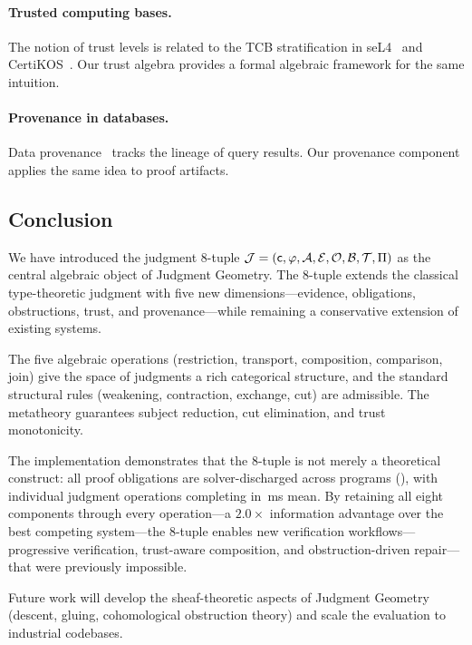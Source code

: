 \documentclass[11pt]{article}
\begin{document}
\paragraph{Trusted computing bases.}
The notion of trust levels is related to the TCB stratification in
seL4~\cite{sel4} and CertiKOS~\cite{certikos}.
Our trust algebra provides a formal algebraic framework for the same
intuition.

\paragraph{Provenance in databases.}
Data provenance~\cite{buneman01,green07} tracks the lineage of query
results.  Our provenance component applies the same idea to proof
artifacts.

\subsection{Conclusion}

We have introduced the judgment 8-tuple
$\mathcal{J} = (\mathsf{c}, \varphi, \mathcal{A}, \mathcal{E}, \mathcal{O}, \mathcal{B}, \mathcal{T}, \Pi)$
as the central algebraic object of Judgment Geometry.  The 8-tuple extends
the classical type-theoretic judgment with five new dimensions---evidence,
obligations, obstructions, trust, and provenance---while remaining a
conservative extension of existing systems.

The five algebraic operations (restriction, transport, composition,
comparison, join) give the space of judgments a rich categorical structure,
and the standard structural rules (weakening, contraction, exchange, cut)
are admissible.  The metatheory guarantees subject reduction, cut
elimination, and trust monotonicity.

The \JuGeo{} implementation demonstrates that the 8-tuple is not merely a
theoretical construct: all \compTrustTotal{} proof obligations are
solver-discharged across \compTotalPrograms{} programs (\compTrustSolverdischargedPct{}),
with individual judgment operations completing in \compMethodsMeanMs{}\,ms mean.
By retaining all eight components
through every operation---a $2.0\times$ information advantage over the
best competing system---the 8-tuple enables new
verification workflows---progressive verification, trust-aware composition,
and obstruction-driven repair---that were previously impossible.

Future work will develop the sheaf-theoretic aspects of Judgment Geometry
(descent, gluing, cohomological obstruction theory) and scale the
evaluation to industrial codebases.
\end{document}
